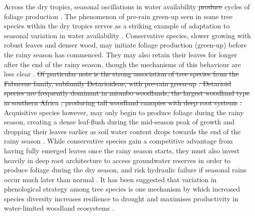 \documentclass[11pt,a4paper]{article}
\providecommand{\DIFaddtex}[1]{{\protect\color{blue}\uwave{#1}}} %
\providecommand{\DIFdeltex}[1]{{\protect\color{red}\sout{#1}}}                      %
\providecommand{\DIFaddbegin}{} %
\providecommand{\DIFaddend}{} %
\providecommand{\DIFdelbegin}{} %
\providecommand{\DIFdelend}{} %
\providecommand{\DIFadd}[1]{\texorpdfstring{\DIFaddtex{#1}}{#1}} %
\providecommand{\DIFdel}[1]{\texorpdfstring{\DIFdeltex{#1}}{}} %
\newcommand{\DIFscaledelfig}{0.5}
\newlength{\DIFdelgraphicswidth} %
\newlength{\DIFdelgraphicsheight} %
\newcommand{\DIFaddincludegraphics}[2][]{{\color{blue}\fbox{\DIFOincludegraphics[#1]{#2}}}} %
\newcommand{\DIFdelincludegraphics}[2][]{%
\sbox{\DIFdelgraphicsbox}{\DIFOincludegraphics[#1]{#2}}%
\settoboxwidth{\DIFdelgraphicswidth}{\DIFdelgraphicsbox} %
\settoboxtotalheight{\DIFdelgraphicsheight}{\DIFdelgraphicsbox} %
\scalebox{\DIFscaledelfig}{%
\parbox[b]{\DIFdelgraphicswidth}{\usebox{\DIFdelgraphicsbox}\\[-\baselineskip] \rule{\DIFdelgraphicswidth}{0em}}\llap{\resizebox{\DIFdelgraphicswidth}{\DIFdelgraphicsheight}{%
\setlength{\unitlength}{\DIFdelgraphicswidth}%
\begin{picture}(1,1)%
\thicklines\linethickness{2pt} %
{\color[rgb]{1,0,0}\put(0,0){\framebox(1,1){}}}%
{\color[rgb]{1,0,0}\put(0,0){\line( 1,1){1}}}%
{\color[rgb]{1,0,0}\put(0,1){\line(1,-1){1}}}%
\end{picture}%
}\hspace*{3pt}}} %
} %
\DeclareRobustCommand{\DIFaddbegin}{\DIFOaddbegin \let\includegraphics\DIFaddincludegraphics} %
\DeclareRobustCommand{\DIFaddend}{\DIFOaddend \let\includegraphics\DIFOincludegraphics} %
\DeclareRobustCommand{\DIFdelbegin}{\DIFOdelbegin \let\includegraphics\DIFdelincludegraphics} %
\DeclareRobustCommand{\DIFdelend}{\DIFOaddend \let\includegraphics\DIFOincludegraphics} %
\begin{document}
Across the dry tropics, seasonal oscillations in water availability \DIFdelbegin \DIFdel{produce }\DIFdelend \DIFaddbegin \DIFadd{drive
seasonal }\DIFaddend cycles of foliage production \citep{Chidumayo2001, Dahlin2016}. The
phenomenon of pre-rain green-up seen in some tree species within the dry
tropics serves as a striking example of adaptation to seasonal variation in
water availability \citep{Ryan2017}. Conservative species, slower growing with
robust leaves and denser wood, may initiate foliage production (green-up)
before the rainy season has commenced. They may also retain their leaves for
longer after the end of the rainy season, though the mechanisms of this
behaviour are less clear \citep{Giraldo2011, Kushwaha2011}. \DIFdelbegin \DIFdel{Of particular note is the strong association of tree species from the Fabaceae family, subfamily Detarioideae, with pre-rain green-up }%
\DIFdel{. Detarioid species are frequently dominant in miombo woodlands, the largest woodland type in southern Africa }%
\DIFdel{, producing tall woodland canopies with deep root systems }%
\DIFdel{. }\DIFdelend Acquisitive species
however, may only begin to produce foliage during the rainy season, creating a
dense leaf-flush during the mid-season peak of growth and dropping their leaves
earlier as soil water content drops towards the end of the rainy season
\citep{Lasky2016}. While conservative species gain a competitive advantage from
having fully emerged leaves once the rainy season starts, they must also invest
heavily in deep root architecture to access groundwater reserves in order to
produce foliage during the dry season, and risk hydraulic failure if seasonal
rains occur much later than normal \citep{Vinya2018}. It has been suggested
that variation in phenological strategy among tree species is one mechanism by
which increased species diversity increases resilience to drought and maximises
productivity in water-limited woodland ecosystems \citep{Stan2019,
Morellato2016}. 
\end{document}
